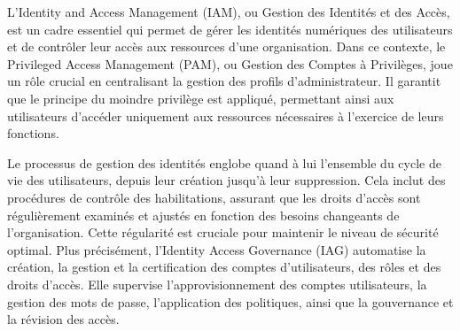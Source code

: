 
L'Identity and Access Management (IAM), ou Gestion des Identités et des Accès, est un cadre essentiel qui permet de gérer les identités numériques des utilisateurs et de contrôler leur accès aux ressources d'une organisation. 
Dans ce contexte, le Privileged Access Management (PAM), ou Gestion des Comptes à Privilèges, joue un rôle crucial en centralisant la gestion des profils d'administrateur. 
Il garantit que le principe du moindre privilège est appliqué, permettant ainsi aux utilisateurs d'accéder uniquement aux ressources nécessaires à l'exercice de leurs fonctions.

Le processus de gestion des identités englobe quand à lui l'ensemble du cycle de vie des utilisateurs, depuis leur création jusqu'à leur suppression. 
Cela inclut des procédures de contrôle des habilitations, assurant que les droits d'accès sont régulièrement examinés et ajustés en fonction des besoins changeants de l'organisation.
Cette régularité est cruciale pour maintenir le niveau de sécurité optimal.
Plus précisément, l'Identity Access Governance (IAG) automatise la création, la gestion et la certification des comptes d'utilisateurs, des rôles et des droits d'accès. 
Elle supervise l'approvisionnement des comptes utilisateurs, la gestion des mots de passe, l'application des politiques, ainsi que la gouvernance et la révision des accès.




